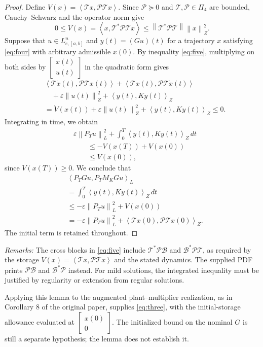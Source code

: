 \documentclass[10pt,twocolumn,letterpaper]{article}
\theoremstyle{definition}
\theoremstyle{plain}
\newcommand{\col}[1]{\begin{bmatrix}#1\end{bmatrix}}
\newcommand{\ip}[2]{\left\langle #1,#2\right\rangle}
\newcommand{\norm}[1]{\left\lVert #1\right\rVert}
\newcommand{\TT}{\mathcal T}
\newcommand{\opB}{\mathcal B}
\newcommand{\opP}{\mathcal P}
\begin{document}
\begin{proof}
Define $V(x)=\ip{\TT x}{\opP\TT x}$. Since $\opP\succeq0$ and
$\TT,\opP\in\Pi_4$ are bounded, Cauchy--Schwarz and the operator
norm give
\[
 0\leq V(x)=\ip{x}{\TT^*\opP\TT x}
 \leq\norm{\TT^*\opP\TT}\norm{x}_Z^2.
\]
Suppose that
$u\in L^n_{e,[a,b]}$ and $y(t)=(Gu)(t)$ for a trajectory
$x$ satisfying \eqref{eq:four} with arbitrary admissible $x(0)$.
By inequality \eqref{eq:five}, multiplying on both sides by
$\col{x(t)\\u(t)}$ in the quadratic form gives
\begin{align*}
 &\ip{\TT\dot x(t)}{\opP\TT x(t)}
   +\ip{\TT x(t)}{\opP\TT\dot x(t)}\\
 &\quad+\varepsilon\norm{u(t)}_Z^2+\ip{y(t)}{Ky(t)}_Z\\
 &=\dot V(x(t))+\varepsilon\norm{u(t)}_Z^2
                         +\ip{y(t)}{Ky(t)}_Z
 \leq0.
\end{align*}
Integrating in time, we obtain
\begin{align*}
 &\varepsilon\norm{P_Tu}_L^2
    +\int_0^T\ip{y(t)}{Ky(t)}_Z\,dt\\
 &\qquad\leq -V(x(T))+V(x(0))\\
 &\qquad\leq V(x(0)),
\end{align*}
since $V(x(T))\geq0$. We conclude that
\begin{align*}
 &\ip{P_TGu}{P_TM_KGu}_L\\
 &=\int_0^T\ip{y(t)}{Ky(t)}_Z\,dt\\
 &\leq-\varepsilon\norm{P_Tu}_L^2+V(x(0))\\
 &=-\varepsilon\norm{P_Tu}_L^2
       +\ip{\TT x(0)}{\opP\TT x(0)}_Z.
\end{align*}
The initial term is retained throughout.
\end{proof}

\noindent\emph{Remarks:}
The cross blocks in \eqref{eq:five} include
$\TT^*\opP\opB$ and $\opB^*\opP\TT$, as required by the storage
$V(x)=\ip{\TT x}{\opP\TT x}$ and the stated dynamics.
The supplied PDF prints $\opP\opB$ and $\opB^*\opP$ instead.
For mild solutions, the integrated inequality must be justified by
regularity or extension from regular solutions.

Applying this lemma to the augmented plant--multiplier realization, as in
Corollary 8 of the original paper, supplies \eqref{eq:three}, with the
initial-storage allowance evaluated at
$\col{x(0)\\0}$. The initialized bound on the nominal $G$ is still
a separate hypothesis; the lemma does not establish it.
\end{document}
